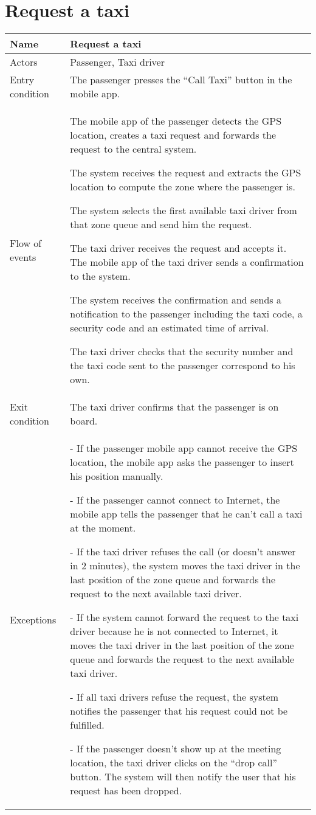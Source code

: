 \section{Request a taxi}
\begin{center}
\begin{longtable}{|l| p{9cm}|}
\hline
Name &
Request a taxi \\
\hline
Actors &
Passenger, Taxi driver \\
\hline
Entry condition & 
The passenger presses the ``Call Taxi'' button in the mobile app. \\
\hline
Flow of events &
The mobile app of the passenger detects the GPS location, creates a taxi request and forwards the request to the central system.

The system receives the request and extracts the GPS location to compute the zone where the passenger is.

The system selects the first available taxi driver from that zone queue and send him the request.

The taxi driver receives the request and accepts it. The mobile app of the taxi driver sends a confirmation to the system.

The system receives the confirmation and sends a notification to the passenger including the taxi code, a security code and an estimated time of arrival.

The taxi driver checks that the security number and the taxi code sent to the passenger correspond to his own. \\
\hline
Exit condition &
The taxi driver confirms that the passenger is on board. \\
\hline
Exceptions &
- If the passenger mobile app cannot receive the GPS location, the mobile app asks the passenger to insert his position manually.

- If the passenger cannot connect to Internet, the mobile app tells the passenger that he can't call a taxi at the moment.

- If the taxi driver refuses the call (or doesn't answer in 2 minutes), the system moves the taxi driver in the last position of the zone queue and forwards the request to the next available taxi driver.

- If the system cannot forward the request to the taxi driver because he is not connected to Internet, it moves the taxi driver in the last position of the zone queue and forwards the request to the next available taxi driver.

- If all taxi drivers refuse the request, the system notifies the passenger that his request could not be fulfilled.

- If the passenger doesn't show up at the meeting location, the taxi driver clicks on the ``drop call'' button. The system will then notify the user that his request has been dropped. \\
\hline
\end{longtable}
\end{center}



